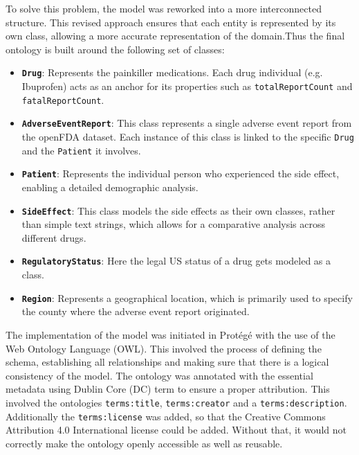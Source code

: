 To solve this problem, the model was reworked into a more interconnected structure. This revised approach ensures that each entity is represented by its own class, allowing a more accurate representation of the domain.Thus the final ontology is built around the following set of classes:
\begin{itemize}
    \item \textbf{\texttt{Drug}}: Represents the painkiller medications. Each drug individual (e.g. Ibuprofen) acts as an anchor for its properties such as \texttt{totalReportCount} and \texttt{fatalReportCount}.
    \item \textbf{\texttt{AdverseEventReport}}: This class represents a single adverse event report from the openFDA dataset. Each instance of this class is linked to the specific \texttt{Drug} and the \texttt{Patient} it involves.
    \item \textbf{\texttt{Patient}}: Represents the individual person who experienced the side effect, enabling a detailed demographic analysis.
    \item \textbf{\texttt{SideEffect}}: This class models the side effects as their own classes, rather than simple text strings, which allows for a comparative analysis across different drugs.
    \item \textbf{\texttt{RegulatoryStatus}}: Here the legal US status of a drug gets modeled as a class.
    \item \textbf{\texttt{Region}}: Represents a geographical location, which is primarily used to specify the county where the adverse event report originated.
\end{itemize}

The implementation of the model was initiated in Protégé with the use of the Web Ontology Language (OWL). This involved the process of defining the schema, establishing all relationships and making sure that there is a logical consistency of the model.
The ontology was annotated with the essential metadata using Dublin Core (DC) term to ensure a proper attribution. This involved the ontologies \texttt{terms:title}, \texttt{terms:creator} and a \texttt{terms:description}. Additionally the \texttt{terms:license} was added, so that the Creative Commons Attribution 4.0 International license could be added. Without that, it would not correctly make the ontology openly accessible as well as reusable.


